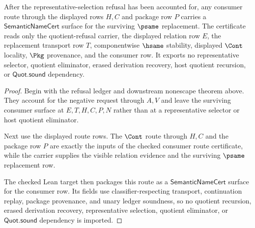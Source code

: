 \begin{theorem}
\label{thm:quotient-soundness-boundary-consumer-route-certificate}
After the representative-selection refusal has been accounted for, any consumer route through the displayed rows $H,C$ and package row $P$ carries a $\mathsf{SemanticNameCert}$ surface for the surviving $\psame$ replacement. The certificate reads only the quotient-refusal carrier, the displayed relation row $E$, the replacement transport row $T$, componentwise $\hsame$ stability, displayed $\Cont$ locality, $\Pkg$ provenance, and the consumer row. It exports no representative selector, quotient eliminator, erased derivation recovery, host quotient recursion, or $\mathsf{Quot.sound}$ dependency.
\end{theorem}
\begin{proof}
Begin with the refusal ledger and downstream nonescape theorem above. They account for the negative request through $A,V$ and leave the surviving consumer surface at $E,T,H,C,P,N$ rather than at a representative selector or host quotient eliminator.

Next use the displayed route rows. The $\Cont$ route through $H,C$ and the package row $P$ are exactly the inputs of the checked consumer route certificate, while the carrier supplies the visible relation evidence and the surviving $\psame$ replacement row.

The checked Lean target then packages this route as a $\mathsf{SemanticNameCert}$ surface for the consumer row. Its fields use classifier-respecting transport, continuation replay, package provenance, and unary ledger soundness, so no quotient recursion, erased derivation recovery, representative selection, quotient eliminator, or $\mathsf{Quot.sound}$ dependency is imported.
\end{proof}

